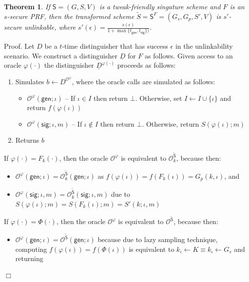 \documentclass{article}
\newtheorem{theorem}{Theorem}[section]
\newenvironment{proof}{\textsf{Proof}.}{\hfill$\Box$}
\begin{document}
\begin{theorem}
If $\mathsf{S}=(G,S,V)$ is a tweak-friendly singature scheme and $F$ is an $s$-secure PRF, then the transformed scheme $\tilde{S}=\mathsf{S}^F=(G_s,G_p,S',V)$ is $s'$-
secure unlinkable, where $s'(\epsilon) = \frac{s(\epsilon)}{1+\max\{t_\mathsf{gen},t_\mathsf{sig}\})}$.
\end{theorem}
\begin{proof}
Let $D$ be a $t$-time distinguisher that has success $\epsilon$ in the unlinkability scenario. We construct a distinguisher $\underline{D}$ for $F$ as follows. Given access to an oracle $\varphi(\cdot)$ the distinguisher $\underline{D}^{\varphi(\cdot)}$
proceeds as follows:
\begin{enumerate}
\item Simulates $b\gets D^{\mathcal{O}^{\varphi}}$, where the oracle calls are simulated as follows:
\begin{itemize}
\item $\mathcal{O}^{\varphi}(\mathsf{gen};\iota)$ -- If $\iota\in I$ then return $\bot$. Otherwise, set $I\gets I \cup \{\iota\}$ and return $f(\varphi(\iota))$
\item $\mathcal{O}^{\varphi}(\mathsf{sig};\iota,m)$ -- If $\iota\not\in I$ then return $\bot$. Otherwise, return $S(\varphi(\iota);m)$
\end{itemize}
\item Returns $b$
\end{enumerate}
If $\varphi(\cdot)=F_k(\cdot)$, then the oracle $\mathcal{O}^\varphi$ is equivalent to  $\mathcal{O}^{\tilde{\mathsf{S}}}_k$, because then:
\begin{itemize}
\item $\mathcal{O}^\varphi(\mathsf{gen};\iota) = \mathcal{O}^{\tilde{\mathsf{S}}}_k(\mathsf{gen};\iota)$ as $f(\varphi(\iota)) = f(F_k(\iota))=G_p(k,\iota)$, and
\item
$\mathcal{O}^\varphi(\mathsf{sig};\iota,m) = \mathcal{O}^{\tilde{\mathsf{S}}}_k(\mathsf{sig};\iota,m)$
due to $S(\varphi(\iota);m)=S(F_k(\iota);m)=S'(k;\iota,m)$
\end{itemize}
If $\varphi(\cdot)=\Phi(\cdot)$, then the oracle $\mathcal{O}^\varphi$ is equivalent to  $\mathcal{O}^{\tilde{\mathsf{S}}}$, because then:
\begin{itemize}
\item $\mathcal{O}^\varphi(\mathsf{gen};\iota) = \mathcal{O}^{\tilde{\mathsf{S}}}(\mathsf{gen};\iota)$
because
due to lazy sampling technique, computing $f(\varphi(\iota)) = f(\Phi(\iota))$
is equivalent to $k_\iota\gets K\equiv k_\iota\gets G_s$ and returning

\end{itemize}
\end{proof}
\end{document}
